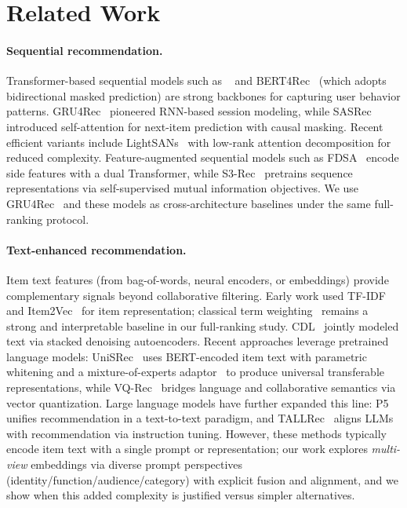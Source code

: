 \section{Related Work}
\paragraph{Sequential recommendation.}
Transformer-based sequential models such as
\base~\cite{kang2018sasrec} and BERT4Rec~\cite{sun2019bert4rec}
(which adopts bidirectional masked prediction) are strong backbones for
capturing user behavior patterns.
GRU4Rec~\cite{hidasi2016gru4rec} pioneered RNN-based session
modeling, while SASRec introduced self-attention for next-item
prediction with causal masking. Recent efficient variants
include LightSANs~\cite{fan2021lightsans} with low-rank
attention decomposition for reduced complexity.
Feature-augmented sequential models such as
FDSA~\cite{zhang2019fdsa} encode side features with a dual
Transformer, while S3-Rec~\cite{zhou2020s3rec} pretrains
sequence representations via self-supervised mutual information
objectives. We use GRU4Rec~\cite{hidasi2016gru4rec} and these
models as cross-architecture baselines under the same
full-ranking protocol.

\paragraph{Text-enhanced recommendation.}
Item text features (from bag-of-words, neural encoders, or
\llm embeddings) provide complementary signals beyond
collaborative filtering. Early work used TF-IDF and
Item2Vec~\cite{barkan2016item2vec} for item representation;
classical term weighting~\cite{salton1988termweighting} remains a
strong and interpretable baseline in our full-ranking study.
CDL~\cite{wang2015cdl} jointly modeled text via stacked
denoising autoencoders. Recent approaches leverage pretrained
language models: UniSRec~\cite{hou2022unisrec} uses
BERT-encoded item text with parametric whitening and a
mixture-of-experts adaptor~\cite{shazeer2017outrageously} to
produce universal transferable representations, while
VQ-Rec~\cite{hou2023vqrec} bridges
language and collaborative semantics via vector quantization.
Large language models have further expanded this line:
P5~\cite{geng2022p5} unifies recommendation in a text-to-text
paradigm, and TALLRec~\cite{bao2023tallrec} aligns LLMs with
recommendation via instruction tuning. However, these methods
typically encode item text with a single prompt or
representation; our work explores \emph{multi-view} \llm
embeddings via diverse prompt perspectives
(identity/function/audience/category) with explicit fusion and
alignment, and we show when this added complexity is justified
versus simpler alternatives.

